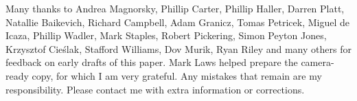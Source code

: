 \documentclass[acmsmall]{acmart}\settopmatter{}
\begin{document}
\begin{acks}                            %

Many thanks to Andrea Magnorsky, Phillip Carter, Phillip Haller, Darren Platt, Natallie Baikevich, Richard Campbell, Adam Granicz, Tomas Petricek, Miguel de Icaza, Phillip Wadler, Mark Staples, Robert Pickering, Simon Peyton Jones, Krzysztof Cieślak, Stafford Williams, Dov Murik, Ryan Riley   and many others for feedback on early drafts of this paper.  Mark Laws helped prepare the camera-ready copy, for which I am very grateful. Any mistakes that remain are my responsibility. Please contact me with extra information or corrections.

\end{acks}





%
\end{document}
